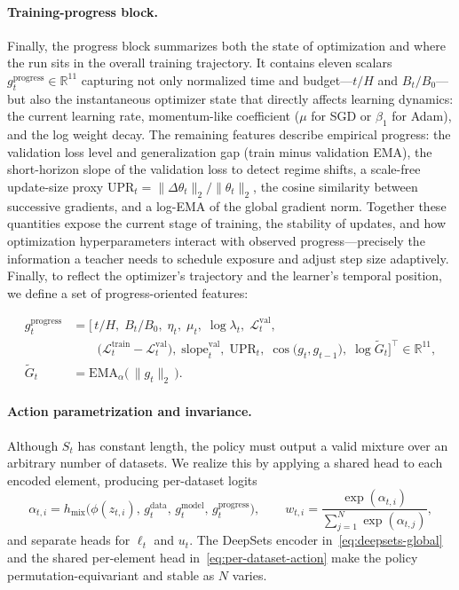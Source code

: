 \documentclass[11pt]{article}
\newcommand{\R}{\mathbb{R}}
\newcommand{\1}{\mathbf{1}}
\begin{document}
\paragraph{Training-progress block.}
Finally, the progress block summarizes both the state of optimization and where the run sits in the overall training trajectory. It contains eleven scalars
\(
g^{\text{progress}}_t\in\R^{11}
\)
capturing not only normalized time and budget---$t/H$ and $B_t/B_0$---but also the instantaneous optimizer state that directly affects learning dynamics: the current learning rate, momentum-like coefficient ($\mu$ for SGD or $\beta_1$ for Adam), and the log weight decay. The remaining features describe empirical progress: the validation loss level and generalization gap (train minus validation EMA), the short-horizon slope of the validation loss to detect regime shifts, a scale-free update-size proxy $\mathrm{UPR}_t=\|\Delta\theta_t\|_2/\|\theta_t\|_2$, the cosine similarity between successive gradients, and a log-EMA of the global gradient norm. Together these quantities expose the current stage of training, the stability of updates, and how optimization hyperparameters interact with observed progress—precisely the information a teacher needs to schedule exposure and adjust step size adaptively. Finally, to reflect the optimizer’s trajectory and the learner’s temporal position, we define a set of progress-oriented features:

\begin{equation}
\label{eq:gprogress-full}
\begin{aligned}
g^{\text{progress}}_t
&= \Big[\,
t/H,\;
B_t/B_0,\;
\eta_t,\;
\mu_t,\;
\log\lambda_t,\;
\mathcal L^{\mathrm{val}}_t,\\[-0.25em]
&\qquad
\big(\mathcal L^{\mathrm{train}}_t-\mathcal L^{\mathrm{val}}_t\big),\;
\mathrm{slope}^{\mathrm{val}}_t,\;
\mathrm{UPR}_t,\;
\cos\!\big(g_t,g_{t-1}\big),\;
\log \widetilde{G}_t
\Big]^{\!\top}\!\in\mathbb{R}^{11},\\[0.25em]
\widetilde{G}_t 
&= \mathrm{EMA}_\alpha\!\big(\,\|g_t\|_2\,\big).
\end{aligned}
\end{equation}


\paragraph{Action parametrization and invariance.}
Although $S_t$ has constant length, the policy must output a valid mixture over an arbitrary number of datasets. We realize this by applying a shared head to each encoded element, producing per-dataset logits
\begin{equation}
\alpha_{t,i}=h_{\text{mix}}\!\big(\phi(z_{t,i}),\, g^{\text{data}}_t,\, g^{\text{model}}_t,\, g^{\text{progress}}_t\big),
\qquad
w_{t,i}=\frac{\exp(\alpha_{t,i})}{\sum_{j=1}^N \exp(\alpha_{t,j})},
\label{eq:per-dataset-action}
\end{equation}
and separate heads for $\ell_t$ and $u_t$. The DeepSets encoder in~\eqref{eq:deepsets-global} and the shared per-element head in~\eqref{eq:per-dataset-action} make the policy permutation-equivariant and stable as $N$ varies.
\end{document}
